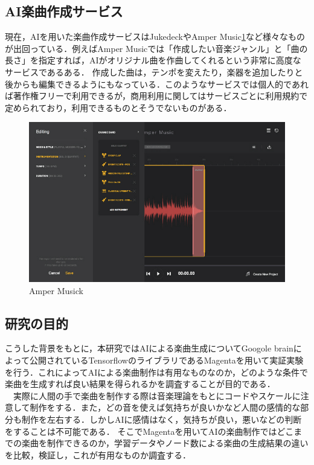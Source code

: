 \subsection{AI楽曲作成サービス}
現在，AIを用いた楽曲作成サービスはJukedeck\cite{webpage10}やAmper Music\ref{fig:Amper Music}\cite{webpage11}など様々なものが出回っている．例えばAmper Musicでは「作成したい音楽ジャンル」と「曲の長さ」を指定すれば，AIがオリジナル曲を作曲してくれるという非常に高度なサービスであるある． 
作成した曲は，テンポを変えたり，楽器を追加したりと後からも編集できるようにもなっている．このようなサービスでは個人的であれば著作権フリーで利用できるが，商用利用に関してはサービスごとに利用規約で定められており，利用できるものとそうでないものがある．\\
\begin{figure}[!ht]
    \begin{screen}
    \begin{center}
        \includegraphics[scale=0.8, clip]{./img/Amper1.jpg}
        \caption{Amper Musick}
        \label{fig:Amper Music}
    \end{center}
\end{screen}
\end{figure}
\newpage
\subsection{研究の目的}
こうした背景をもとに，本研究ではAIによる楽曲生成についてGoogole brainによって公開されているTensorflowのライブラリであるMagentaを用いて実証実験を行う．これによってAIによる楽曲制作は有用なものなのか，どのような条件で楽曲を生成すれば良い結果を得られるかを調査することが目的である．\\
　実際に人間の手で楽曲を制作する際は音楽理論をもとにコードやスケールに注意して制作をする．また，どの音を使えば気持ちが良いかなど人間の感情的な部分も制作を左右する．しかしAIに感情はなく，気持ちが良い，悪いなどの判断をすることは不可能である．
そこでMagentaを用いてAIの楽曲制作ではどこまでの楽曲を制作できるのか，学習データやノード数による楽曲の生成結果の違いを比較，検証し，これが有用なものか調査する．\\
\newpage
